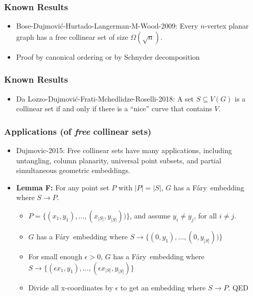 \documentclass[xcolor=dvipsnames]{beamer}
\newcommand{\Fary}{F\'ary}
\begin{document}
\begin{frame}
   \frametitle{Known Results}
   \begin{itemize}
      \item<+-> Bose-Dujmovi\'c-Hurtado-Langerman-M-Wood-2009: Every
      $n$-vertex planar graph has a free collinear set of size
      $\Omega(\sqrt{n})$.
      \item<+-> Proof by canonical ordering or by Schnyder decomposition
   \end{itemize}
\end{frame}


\begin{frame}
   \frametitle{Known Results}
   \begin{itemize}
      \item<+->Da Lozzo-Dujmovi\'c-Frati-Mchedlidze-Roselli-2018:
      A set $S\subseteq V(G)$ is a collinear set if and only if there is a ``nice''
      curve that contains $V$.\\



   \end{itemize}
\end{frame}

\begin{frame}
   \frametitle{Applications (of \emph{free} collinear sets)}

   \begin{itemize}
      \item<+-> Dujmovic-2015: Free collinear sets have many applications, including untangling, column planarity, universal point subsets, and partial simultaneous geometric embeddings.
      \item<+->\textbf{Lemma F:} For any point set $P$ with $|P|=|S|$, $G$ has a \Fary\ embedding where $S\to P$.
      \begin{itemize}
        \item<+-> $P=\{(x_1,y_1),\ldots,(x_{|S|},y_{|S|}))\}$, and assume $y_i\neq y_j$, for all $i\neq j$.
        \item<+-> $G$ has a \Fary\ embedding where $S\to \{(0,y_1),\ldots,(0,y_{|S|}))\}$
        \item<+-> For small enough $\epsilon >0$,  $G$ has a \Fary\ embedding where
          $S\to \{(\epsilon x_1,y_1),\ldots,(\epsilon x_{|S|},y_{|S|})\}$
        \item<+-> Divide all x-coordinates by $\epsilon$ to get an embedding where $S\to P$. \hfill{QED} 
      \end{itemize}
   \end{itemize}
\end{frame}
 
\end{document}
